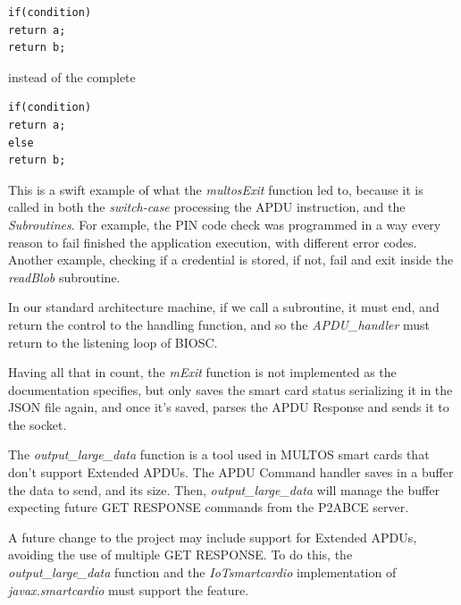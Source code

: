 \begin{verbatim}
if(condition)
return a;
return b;
\end{verbatim}

instead of the complete

\begin{verbatim}
if(condition)
return a;
else
return b;
\end{verbatim}

This is a swift example of what the \textit{multosExit} function led to, because it is called in both the \textit{switch-case} processing the APDU instruction, and the \textit{Subroutines}. For example, the PIN code check was programmed in a way every reason to fail finished the application execution, with different error codes. Another example, checking if a credential is stored, if not, fail and exit inside the \textit{readBlob} subroutine.

In our standard architecture machine, if we call a subroutine, it must end, and return the control to the handling function, and so the \textit{APDU\_handler} must return to the listening loop of BIOSC.

Having all that in count, the \textit{mExit} function is not implemented as the documentation specifies, but only saves the smart card status serializing it in the JSON file again, and once it's saved, parses the APDU Response and sends it to the socket.

The \textit{output\_large\_data} function is a tool used in MULTOS smart cards that don't support Extended APDUs. The APDU Command handler saves in a buffer the data to send, and its size. Then, \textit{output\_large\_data} will manage the buffer expecting future GET RESPONSE commands from the P2ABCE server.

A future change to the project may include support for Extended APDUs, avoiding the use of multiple GET RESPONSE. To do this, the \textit{output\_large\_data} function and the \textit{IoTsmartcardio} implementation of \textit{javax.smartcardio} must support the feature.






